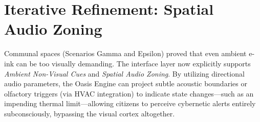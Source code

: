 \section{Iterative Refinement: Spatial Audio Zoning}
Communal spaces (Scenarios Gamma and Epsilon) proved that even ambient e-ink can be too visually demanding. The interface layer now explicitly supports \textit{Ambient Non-Visual Cues} and \textit{Spatial Audio Zoning}. By utilizing directional audio parameters, the Oasis Engine can project subtle acoustic boundaries or olfactory triggers (via HVAC integration) to indicate state changes—such as an impending thermal limit—allowing citizens to perceive cybernetic alerts entirely subconsciously, bypassing the visual cortex altogether.
